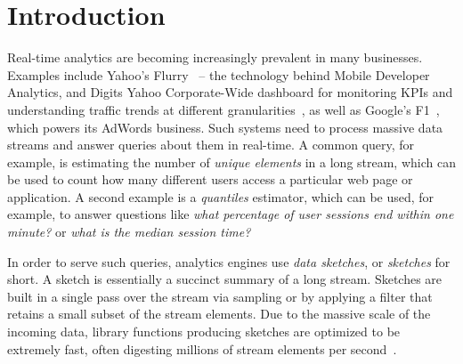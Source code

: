 
\section{Introduction}


Real-time analytics are becoming increasingly prevalent in many businesses. 
Examples include Yahoo's Flurry~\cite{flurry} --
the technology behind Mobile Developer Analytics, and Digits Yahoo Corporate-Wide dashboard for monitoring KPIs and understanding traffic trends at different granularities~\cite{digits},
as well as Google's F1~\cite{Shute2013}, which powers its AdWords
business.
Such systems need to process massive data streams and answer queries about them in real-time.
A common query, for example, is estimating the number of \emph{unique elements} in a long stream, which 
can be used to count how many different users access a particular web page or application. 
A second example is a \emph{quantiles} estimator, which can be used, for example, to  answer questions like  \emph{what percentage of user sessions end within one minute?} or \emph{what is the median session time?}

In order to serve such queries, analytics engines use 
\emph{data sketches}, or \emph{sketches} for short. A sketch is essentially 
a succinct summary of a long stream. 
Sketches are built in a single pass over the stream via sampling or by applying a filter 
that retains a small subset  of the stream elements. 
Due to the massive scale of the incoming data,   library functions producing sketches
are optimized to be extremely fast, often digesting millions of stream elements per second~\cite{sketchesLibrary}. 


